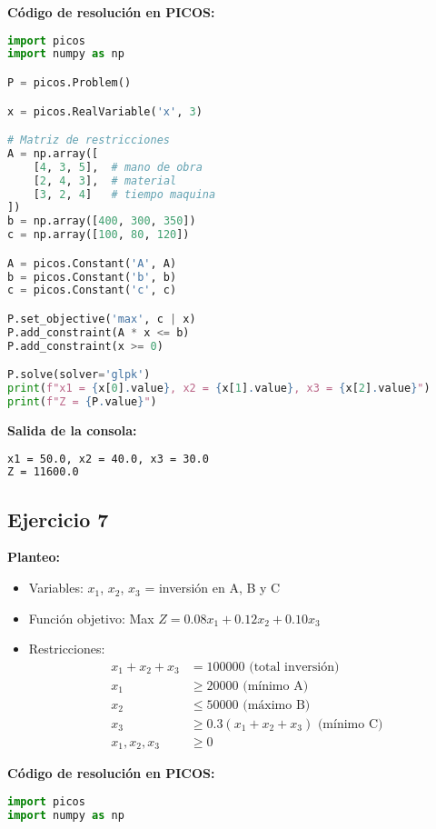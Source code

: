 \documentclass[12pt]{article}
\begin{document}
\begin{enumerate}
\textbf{Código de resolución en PICOS:}
\begin{lstlisting}[language=Python]
import picos
import numpy as np

P = picos.Problem()

x = picos.RealVariable('x', 3)

# Matriz de restricciones
A = np.array([
    [4, 3, 5],  # mano de obra
    [2, 4, 3],  # material
    [3, 2, 4]   # tiempo maquina
])
b = np.array([400, 300, 350])
c = np.array([100, 80, 120])

A = picos.Constant('A', A)
b = picos.Constant('b', b)
c = picos.Constant('c', c)

P.set_objective('max', c | x)
P.add_constraint(A * x <= b)
P.add_constraint(x >= 0)

P.solve(solver='glpk')
print(f"x1 = {x[0].value}, x2 = {x[1].value}, x3 = {x[2].value}")
print(f"Z = {P.value}")
\end{lstlisting}

\textbf{Salida de la consola:}
\begin{lstlisting}[language=bash,backgroundcolor=\color{black},basicstyle=\color{white}\ttfamily,numbers=none]
x1 = 50.0, x2 = 40.0, x3 = 30.0
Z = 11600.0
\end{lstlisting}

\subsection*{Ejercicio 7}

\textbf{Planteo:}
\begin{itemize}
\item Variables: $x_1$, $x_2$, $x_3$ = inversión en A, B y C
\item Función objetivo: Max $Z = 0.08x_1 + 0.12x_2 + 0.10x_3$
\item Restricciones:
  \begin{align*}
  x_1 + x_2 + x_3 &= 100000 \text{ (total inversión)} \\
  x_1 &\geq 20000 \text{ (mínimo A)} \\
  x_2 &\leq 50000 \text{ (máximo B)} \\
  x_3 &\geq 0.3(x_1 + x_2 + x_3) \text{ (mínimo C)} \\
  x_1, x_2, x_3 &\geq 0
  \end{align*}
\end{itemize}

\textbf{Código de resolución en PICOS:}
\begin{lstlisting}[language=Python]
import picos
import numpy as np


\end{lstlisting}
\end{enumerate}
\end{document}
